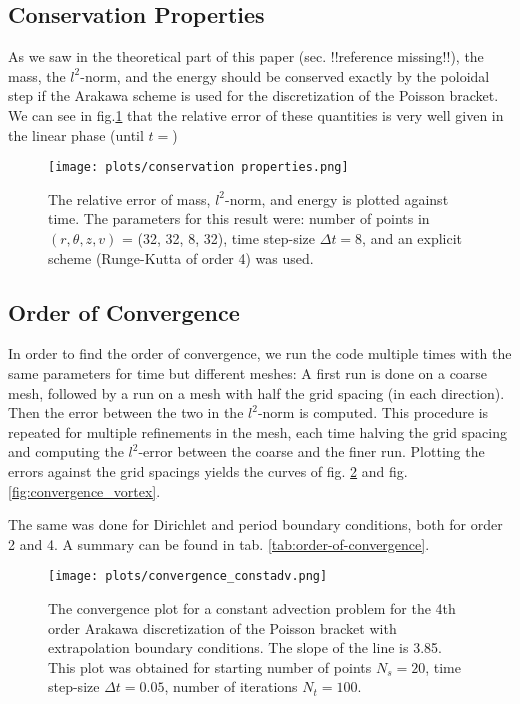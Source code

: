 
\subsection{Conservation Properties}

As we saw in the theoretical part of this paper (sec. !!reference missing!!), the mass, the $l^2$-norm, and the energy should be conserved exactly by the poloidal step if the Arakawa scheme is used for the discretization of the Poisson bracket. We can see in fig.\ref{fig:conservation-properties} that the relative error of these quantities is very well given in the linear phase (until $t=$)

\begin{figure}
    \centering
    \texttt{[image: plots/conservation properties.png]}
    \caption{The relative error of mass, $l^2$-norm, and energy is plotted against time. The parameters for this result were: number of points in $(r, \theta, z, v)$ = (32, 32, 8, 32), time step-size $\Delta t = 8$, and an explicit scheme (Runge-Kutta of order 4) was used.}
    \label{fig:conservation-properties}
\end{figure}

\subsection{Order of Convergence}

In order to find the order of convergence, we run the code multiple times with the same parameters for time but different meshes: A first run is done on a coarse mesh, followed by a run on a mesh with half the grid spacing (in each direction). Then the error between the two in the $l^2$-norm is computed. This procedure is repeated for multiple refinements in the mesh, each time halving the grid spacing and computing the $l^2$-error between the coarse and the finer run. Plotting the errors against the grid spacings yields the curves of fig. \ref{fig:convergence_constadv} and fig. \ref{fig:convergence_vortex}.

The same was done for Dirichlet and period boundary conditions, both for order 2 and 4. A summary can be found in tab. \ref{tab:order-of-convergence}.

\begin{figure}[h]
    \centering
    \texttt{[image: plots/convergence\_constadv.png]}
    \caption{The convergence plot for a constant advection problem for the 4th order Arakawa discretization of the Poisson bracket with extrapolation boundary conditions. The slope of the line is 3.85. This plot was obtained for starting number of points $N_s=20$, time step-size $\Delta t = 0.05$, number of iterations $N_t = 100$.}
    \label{fig:convergence_constadv}
\end{figure}


